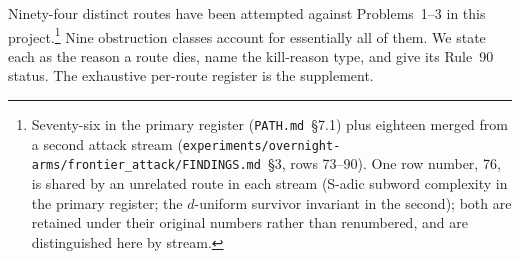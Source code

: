 \documentclass[11pt]{article}
\theoremstyle{definition}
\begin{document}

Ninety-four distinct routes have been attempted against
Problems~1--3 in this project.\footnote{Seventy-six in the primary register
(\texttt{PATH.md}~\S7.1) plus eighteen merged from a second attack stream
(\texttt{experiments/overnight-arms/frontier\_attack/FINDINGS.md}~\S3, rows
73--90). One row number, 76, is shared by an unrelated route in each stream
(S-adic subword complexity in the primary register; the $d$-uniform survivor
invariant in the second); both are retained under their original numbers
rather than renumbered, and are distinguished here by stream.} Nine
obstruction classes account for essentially
all of them. We state each as the reason a route dies, name the kill-reason type,
and give its Rule~90 status. The exhaustive per-route register is the supplement.
\end{document}
